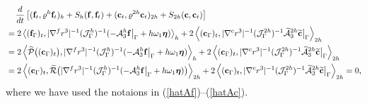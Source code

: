 \begin{align*}\label{semi_energy_2}
&\hspace{0.4cm}\frac{d}{dt}\left[({\bf f}_t,\varrho^h {\bf f}_t)_{h} + S_{h}({\bf f},{\bf f}_t) + ({\bf c}_t,\varrho^{2h} {\bf c}_t)_{2h} + S_{2h}({\bf c},{\bf c}_t) \right]   \nonumber\\
& = 2\left<({\bf f}_\Gamma)_t,|\nabla^f r^{3}|^{-1}(\mathcal{J}^h_\Gamma)^{-1}(-\mathcal{A}_3^h{\bf f}\big|_\Gamma+h\omega_1{\bm \eta})\right>_{h}+ 2\left<({\bf c}_\Gamma)_t,|\nabla^c r^{3}|^{-1}(\mathcal{J}^{2h}_\Gamma)^{-1}\wt{\mathcal{A}}_3^{2h}\wt{\bf c}\big|_\Gamma\right>_{2h} \nonumber\\
& = 2\left<\wt{\mathcal{P}}\big(({\bf c}_\Gamma)_t\big),|\nabla^f r^{3}|^{-1}(\mathcal{J}^h_\Gamma)^{-1}(-\mathcal{A}_3^h{\bf f}\big|_\Gamma+h\omega_1{\bm \eta})\right>_{h}+ 2\left<({\bf c}_\Gamma)_t,|\nabla^c r^{3}|^{-1}(\mathcal{J}^{2h}_\Gamma)^{-1}\wt{\mathcal{A}}_3^{2h}\wt{\bf c}\big|_\Gamma\right>_{2h} \nonumber\\
& = 2\left<({\bf c}_\Gamma)_t,\wt{\mathcal{R}}\big(|\nabla^f r^{3}|^{-1}(\mathcal{J}^h_\Gamma)^{-1}(-\mathcal{A}_3^h{\bf f}\big|_\Gamma+h\omega_1{\bm \eta})\big)\right>_{2h}+ 2\left<({\bf c}_\Gamma)_t,|\nabla^c r^{3}|^{-1}(\mathcal{J}^{2h}_\Gamma)^{-1}\wt{\mathcal{A}}_3^{2h}\wt{\bf c}\big|_\Gamma\right>_{2h} = 0,
\end{align*}
where we have used the notaions in (\ref{hatAf})--(\ref{hatAc}).
